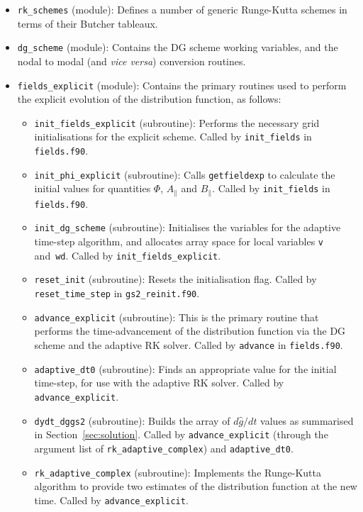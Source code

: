 \documentclass[10pt,a4paper]{article}
\begin{document}
\begin{itemize}

\item \texttt{rk\_schemes} (module): Defines a number of generic Runge-Kutta
  schemes in terms of their Butcher tableaux.

\item \texttt{dg\_scheme} (module): Contains the DG scheme working variables,
  and the nodal to modal (and \textit{vice versa}) conversion routines.

\item \texttt{fields\_explicit} (module): Contains the primary routines used
  to perform the explicit evolution of the distribution function, as follows:

\begin{itemize}

\item \texttt{init\_fields\_explicit} (subroutine): Performs the necessary
  grid initialisations for the explicit scheme. Called by
  \texttt{init\_fields} in \texttt{fields.f90}.

\item \texttt{init\_phi\_explicit} (subroutine): Calls \texttt{getfieldexp} to
  calculate the initial values for quantities $\Phi$, $A_\parallel$ and
  $B_\parallel$. Called by \texttt{init\_fields} in \texttt{fields.f90}.

\item \texttt{init\_dg\_scheme} (subroutine): Initialises the variables for
  the adaptive time-step algorithm, and allocates array space for local
  variables \texttt{v} and~\texttt{wd}. Called by
  \texttt{init\_fields\_explicit}.

\item \texttt{reset\_init} (subroutine): Resets the initialisation
  flag. Called by \texttt{reset\_time\_step} in \texttt{gs2\_reinit.f90}.

\item \texttt{advance\_explicit} (subroutine): This is the primary routine
  that performs the time-advancement of the distribution function via the DG
  scheme and the adaptive RK solver. Called by \texttt{advance} in
  \texttt{fields.f90}.

\item \texttt{adaptive\_dt0} (subroutine): Finds an appropriate value for the
  initial time-step, for use with the adaptive RK solver. Called by
  \texttt{advance\_explicit}.

\item \texttt{dydt\_dggs2} (subroutine): Builds the array of $d\hat{g}/dt$
  values as summarised in Section~\ref{sec:solution}. Called by
  \texttt{advance\_explicit} (through the argument list of
  \texttt{rk\_adaptive\_complex}) and \texttt{adaptive\_dt0}.

\item \texttt{rk\_adaptive\_complex} (subroutine): Implements the Runge-Kutta
  algorithm to provide two estimates of the distribution function at the new
  time. Called by \texttt{advance\_explicit}.

\end{itemize}
\end{itemize}
\end{document}
